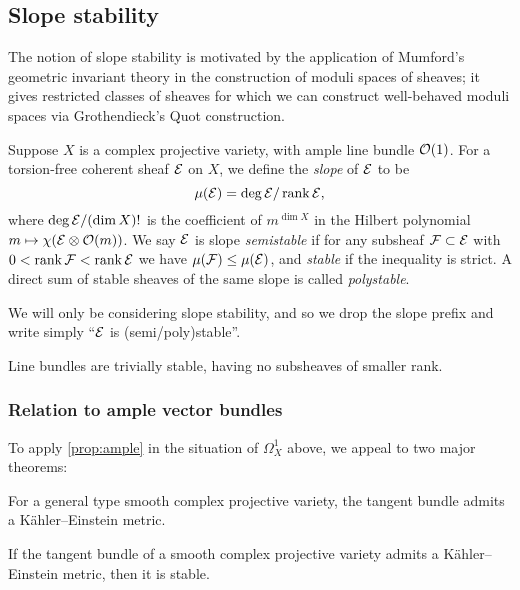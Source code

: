 \subsection{Slope stability}

The notion of slope stability is motivated by the application of Mumford's
geometric invariant theory in the construction of moduli spaces of sheaves; it
gives restricted classes of sheaves for which we can construct well-behaved
moduli spaces via Grothendieck's Quot construction.

\begin{definition}
    Suppose $X$ is a complex projective variety, with ample line bundle $\mathcal{O}(1)$.
    For a torsion-free coherent sheaf $\mathcal{E}$ on $X$, we define the \emph{slope}
    of $\mathcal{E}$ to be
    \begin{equation*}
        \mu(\mathcal{E}) = \deg\mathcal{E} / \operatorname{rank}\mathcal{E},
    \end{equation*}
    where $\deg\mathcal{E}/(\dim X)!$ is the coefficient of $m^{\dim X}$ in the
    Hilbert polynomial $m\mapsto\chi(\mathcal{E}\otimes\mathcal{O}(m))$. We say $\mathcal{E}$ is
    slope \emph{semistable} if for any subsheaf $\mathcal{F}\subset\mathcal{E}$ with
    $0<\operatorname{rank}\mathcal{F}<\operatorname{rank}\mathcal{E}$ we have $\mu(\mathcal{F})\le\mu(\mathcal{E})$, and
    \emph{stable} if the inequality is strict. A direct sum of stable sheaves of
    the same slope is called \emph{polystable}.
\end{definition}

We will only be considering slope stability, and so we drop the slope prefix and
write simply ``$\mathcal{E}$ is (semi/poly)stable''. 

\begin{remark}
    Line bundles are trivially stable, having no subsheaves of smaller rank.
\end{remark}

\subsubsection{Relation to ample vector bundles}

To apply \cref{prop:ample} in the situation of $\Omega^1_X$ above, we appeal to
two major theorems:

\begin{theorem}
    For a general type smooth complex projective variety, the tangent bundle
    admits a K\"ahler--Einstein metric.
\end{theorem}

\begin{theorem}
    If the tangent bundle of a smooth complex projective variety admits a
    K\"ahler--Einstein metric, then it is stable.
\end{theorem}

